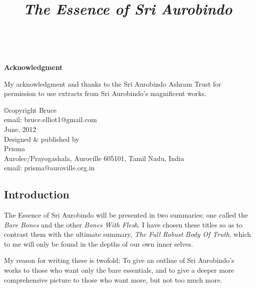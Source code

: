 \documentclass[12pt,a4paper]{book}
\title{%
  {\emph{The Essence of Sri Aurobindo}}}
\date{}
\begin{document}

\Large
\thispagestyle{empty}
\maketitle


\
\vspace{2cm}
\begin{center}{\bf Acknowledgment}\end{center}
\thispagestyle{empty}

My acknowledgment and thanks to the Sri Aurobindo Ashram Trust for
permission to use extracts from Sri Aurobindo's magnificent works.

\vspace{1.5cm}

\begin{center}
\copyright copyright Bruce\\
email: bruce.elliot1@gmail.com\\
June, 2012\\
\vspace{1cm}
Designed \& published by\\
Prisma\\
Aurolec/Prayogashala, Auroville 605101, Tamil Nadu, India\\
email: prisma@auroville.org.in\\
\end{center}
\newpage

\pagestyle{plain}
\begin{center}\section*{Introduction}\end{center}

The Essence of Sri Aurobindo will be presented in two summaries; one
called the \emph{Bare Bones} and the other \emph{Bones With Flesh}. I
have chosen these titles so as to contrast them with the ultimate
summary, \emph{The Full Robust Body Of Truth}, which to me will only
be found in the depths of our own inner selves.

My reason for writing these is twofold: To give an outline of Sri
Aurobindo's works to those who want only the bare essentials, and to
give a deeper more comprehensive picture to those who want more, but
not too much more.
\end{document}
